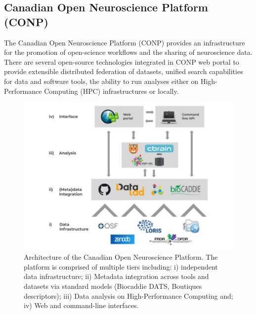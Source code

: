 





\subsection{Canadian Open Neuroscience Platform (CONP)}

The Canadian Open Neuroscience Platform (CONP) provides an infrastructure for the promotion of open-science workflows and the sharing of neuroscience data. There are several open-source technologies integrated in CONP web portal to provide extensible distributed federation of datasets, unified search capabilities for data and software tools, the ability to run analyses either on High-Performance Computing (HPC) infrastructures or locally.


\begin{figure}
    \centering
    \includegraphics[width=\textwidth]{figures/CONP_figure.pdf}
    \caption{Architecture of the Canadian Open Neuroscience Platform. The platform is comprised of multiple tiers including:  i) independent data infrastructure; ii) Metadata integration across tools and datasets via standard models (Biocaddie DATS, Boutiques descriptors); iii) Data analysis on High-Performance Computing and; iv) Web and command-line interfaces. \cite{CONP}}
    \label{fig:CONP_figure}
\end{figure}

